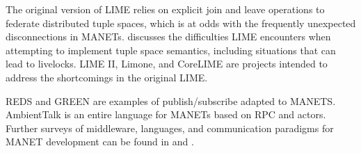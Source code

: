 \documentclass{llncs}
\begin{document}
The original version of LIME relies on explicit join and leave operations to federate distributed tuple spaces, which is at odds with the frequently unexpected disconnections in MANETs. \cite{limerevisted} discusses the difficulties LIME encounters when attempting to implement tuple space semantics, including situations that can lead to livelocks. LIME II\cite{lime2}, Limone\cite{limone}, and CoreLIME\cite{corelime} are projects intended to address the shortcomings in the original LIME.

REDS\cite{reds} and GREEN\cite{green} are examples of publish/subscribe adapted to MANETS. AmbientTalk\cite{ambienttalk} is an entire language for MANETs based on RPC and actors. Further surveys of middleware, languages, and communication paradigms for MANET development can be found in \cite{mine} and \cite{mwtrends}.




\end{document}
